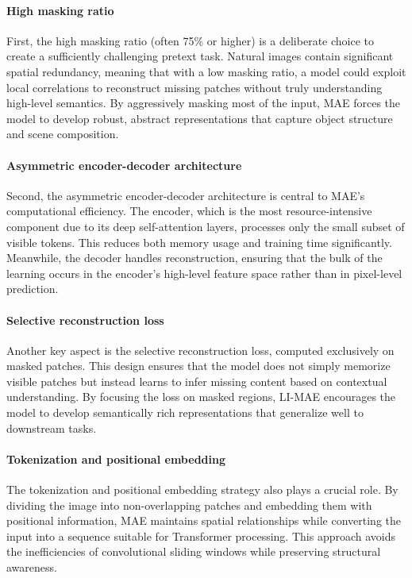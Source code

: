 \paragraph{High masking ratio} First, the high masking ratio (often 75\% or higher) is a deliberate choice to create a sufficiently challenging pretext task. Natural images contain significant spatial redundancy, meaning that with a low masking ratio, a model could exploit local correlations to reconstruct missing patches without truly understanding high-level semantics. By aggressively masking most of the input, MAE forces the model to develop robust, abstract representations that capture object structure and scene composition.

\paragraph{Asymmetric encoder-decoder architecture} Second, the asymmetric encoder-decoder architecture is central to MAE’s computational efficiency. The encoder, which is the most resource-intensive component due to its deep self-attention layers, processes only the small subset of visible tokens. This reduces both memory usage and training time significantly.
Meanwhile, the  decoder handles reconstruction, ensuring that the bulk of the learning occurs in the encoder’s high-level feature space rather than in pixel-level prediction.

\paragraph{Selective reconstruction loss} Another key aspect is the selective reconstruction loss, computed exclusively on masked patches. This design ensures that the model does not simply memorize visible patches but instead learns to infer missing content based on contextual understanding. By focusing the loss on masked regions, LI-MAE encourages the model to develop semantically rich representations that generalize well to downstream tasks.

\paragraph{Tokenization and positional embedding} The tokenization and positional embedding strategy also plays a crucial role. By dividing the image into non-overlapping patches and embedding them with positional information, MAE maintains spatial relationships while converting the input into a sequence suitable for Transformer processing. This approach avoids the inefficiencies of convolutional sliding windows while preserving structural awareness.

